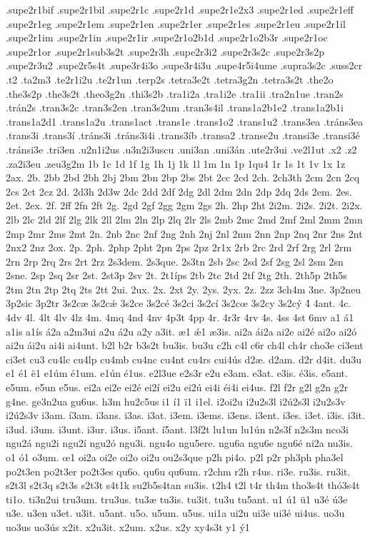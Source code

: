 {.supe2r1bif
.supe2r1bil
.supe2r1c
.supe2r1d
.supe2r1e2x3
.supe2r1ed
.supe2r1eff
.supe2r1eg
.supe2r1em
.supe2r1en
.supe2r1er
.supe2r1es
.supe2r1eu
.supe2r1il
.supe2r1im
.supe2r1in
.supe2r1ir
.supe2r1o2b1d
.supe2r1o2b3r
.supe2r1oc
.supe2r1or
.supe2r1sub3s2t
.supe2r3h
.supe2r3i2
.supe2r3s2c
.supe2r3s2p
.supe2r3u2
.supe2r5s4t
.supe3r4i3o
.supe3r4i3u
.supe4r5i4ume
.supra3s2c
.suss2cr
.t2
.ta2m3
.te2r1i2u
.te2r1un
.terp2s
.tetra3e2t
.tetra3g2n
.tetra3s2t
.the2o
.the3s2p
.the3s2t
.theo3g2n
.thi3s2b
.tra1i2a
.tra1i2e
.tra1ii
.tra2n1ue
.tran2s
.trán2s
.tran3s2c
.tran3s2en
.tran3s2um
.tran3s4il
.trans1a2b1e2
.trans1a2b1i
.trans1a2d1
.trans1a2u
.trans1act
.trans1e
.trans1o2
.trans1u2
.trans3ea
.tráns3ea
.trans3i
.trans3í
.tráns3i
.tráns3i4i
.trans3íb
.transa2
.transe2u
.transi3e
.transi3é
.tránsi3e
.tri3en
.u2n1i2us
.u3n2i3uscu
.uni3an
.uni3án
.ute2r3ui
.ve2l1ut
.x2
.z2
.za2i3eu
.zeu3g2m
1b
1c
1d
1f
1g
1h
1j
1k
1l
1m
1n
1p
1qu4
1r
1s
1t
1v
1x
1z
2ax.
2b.
2bb
2bd
2bh
2bj
2bm
2bn
2bp
2bs
2bt
2cc
2cd
2ch.
2ch3th
2cm
2cn
2cq
2cs
2ct
2cz
2d.
2d3h
2d3w
2dc
2dd
2df
2dg
2dl
2dm
2dn
2dp
2dq
2ds
2em.
2es.
2et.
2ex.
2f.
2ff
2fn
2ft
2g.
2gd
2gf
2gg
2gm
2gs
2h.
2hp
2ht
2i2m.
2i2s.
2i2t.
2i2x.
2lb
2lc
2ld
2lf
2lg
2lk
2ll
2lm
2ln
2lp
2lq
2lr
2ls
2mb
2mc
2md
2mf
2ml
2mm
2mn
2mp
2mr
2ms
2mt
2n.
2nb
2nc
2nf
2ng
2nh
2nj
2nl
2nm
2nn
2np
2nq
2nr
2ns
2nt
2nx2
2nz
2ox.
2p.
2ph.
2php
2pht
2pn
2ps
2pz
2r1x
2rb
2rc
2rd
2rf
2rg
2rl
2rm
2rn
2rp
2rq
2rs
2rt
2rz
2s3dem.
2s3que.
2s3tn
2sb
2sc
2sd
2sf
2sg
2sl
2sm
2sn
2sne.
2sp
2sq
2sr
2st.
2st3p
2sv
2t.
2t1íps
2tb
2tc
2td
2tf
2tg
2th.
2th5p
2th5s
2tm
2tn
2tp
2tq
2ts
2tt
2ui.
2ux.
2x.
2xt
2y.
2ys.
2yx.
2z.
2zz
3ch4m
3ne.
3p2neu
3p2sic
3p2tr
3s2cæ
3s2cǽ
3s2ce
3s2cé
3s2ci
3s2cí
3s2cœ
3s2cy
3s2cý
4́
4ant.
4c.
4dv
4l.
4lt
4lv
4lz
4m.
4mq
4nd
4nv
4p3t
4pp
4r.
4r3r
4rv
4s.
4ss
4st
6mv
a1
á1
a1is
a1ís
á2a
a2m3ui
a2u
á2u
a2y
a3it.
æ1
ǽ1
æ3is.
ai2a
ái2a
ai2e
ai2é
ai2o
ai2ó
ai2u
ái2u
ai4i
ai4unt.
b2l
b2r
b3s2t
bu3is.
bu3u
c2h
c4l
c6r
ch4l
ch4r
cho3e
ci3ent
ci3et
cu3
cu4lc
cu4lp
cu4mb
cu4nc
cu4nt
cu4rs
cui4ús
d2æ.
d2am.
d2r
d4it.
du3u
e1
é1
ë1
e1úm
é1um.
e1ún
é1us.
e2l3ue
e2s3r
e2u
e3am.
e3at.
e3is.
é3is.
e5ant.
e5um.
e5un
e5us.
ei2a
ei2e
ei2é
ei2í
ei2u
ei2ú
ei4i
éi4i
ei4us.
f2l
f2r
g2l
g2n
g2r
g4ne.
ge3n2ua
gu6us.
h3m
hu2c5us
i1
í1
ï1
i1el.
i2oi2u
i2u2s3l
i2ú2s3l
i2u2s3v
i2ú2s3v
i3am.
í3am.
i3ans.
i3as.
i3at.
i3em.
i3ems.
i3ens.
i3ent.
i3es.
i3et.
i3is.
i3it.
i3ud.
i3um.
i3unt.
i3ur.
i3us.
i5ant.
í5ant.
l3f2t
lu1un
lu1ún
n2s3f
n2s3m
nco3i
ngu2á
ngu2i
ngu2í
ngu2ó
ngu3i.
ngu4o
ngu5ere.
ngu6a
ngu6e
ngu6é
ni2a
nu3is.
o1
ó1
o3um.
œ1
oi2a
oi2e
oi2o
oi2u
ou2s3que
p2h
pi4o.
p2l
p2r
ph3ph
pha3el
po2t3en
po2t3er
po2t3es
qu6o.
qu6u
qu6um.
r2chm
r2h
r4us.
ri3e.
ru3is.
ru3it.
s2t3l
s2t3q
s2t3s
s2t3t
s4t1k
su2b5s4tan
su3is.
t2h4
t2l
t4r
th4m
tho3s4t
thó3s4t
ti1o.
ti3n2ui
tru3um.
tru3us.
tu3æ
tu3is.
tu3it.
tu3u
tu5ant.
u1
ú1
ü1
u3é
ú3e
u3e.
u3en
u3et.
u3it.
u5ant.
u5o.
u5um.
u5us.
ui1a
ui2u
ui3e
ui3é
ui4us.
uo3u
uo3us
uo3ús
x2it.
x2u3it.
x2um.
x2us.
x2y
xy4s3t
y1
ý1
}
